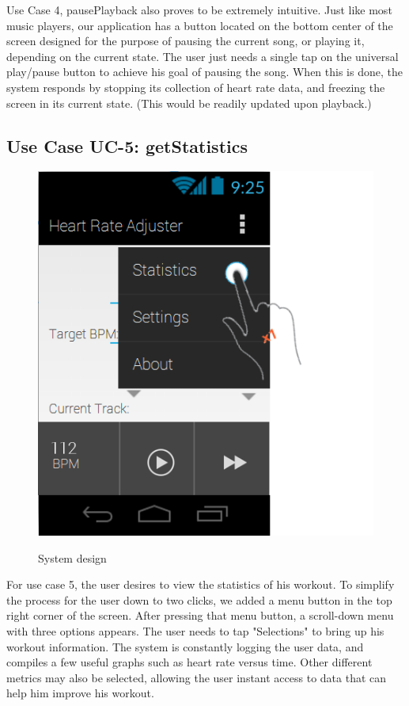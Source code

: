 \documentclass[letterpaper,english, 12pt]{scrreprt}
\begin{document}
Use Case 4, pausePlayback also proves to be extremely intuitive. Just like most music players, our application has a button located on the bottom center of the screen designed for the purpose of pausing the current song, or playing it, depending on the current state. The user just needs a single tap on the universal play/pause button to achieve his goal of pausing the song. When this is done, the system responds by stopping its collection of heart rate data, and freezing the screen in its current state. (This would be readily updated upon playback.)

\subsection{Use Case UC-5: getStatistics}

\begin{figure}[H]
	\centering
	\includegraphics{img/Prelim_Design/PrelimDesign_4.png}\\
	\caption{System design}
\end{figure}

For use case 5, the user desires to view the statistics of his workout. To simplify the process for the user down to two clicks, we added a menu button in the top right corner of the screen. After pressing that menu button, a scroll-down menu with three options appears. The user needs to tap "Selections" to bring up his workout information. The system is constantly logging the user data, and compiles a few useful graphs such as heart rate versus time. Other different metrics may also be selected, allowing the user instant access to data that can help him improve his workout. 
\end{document}
